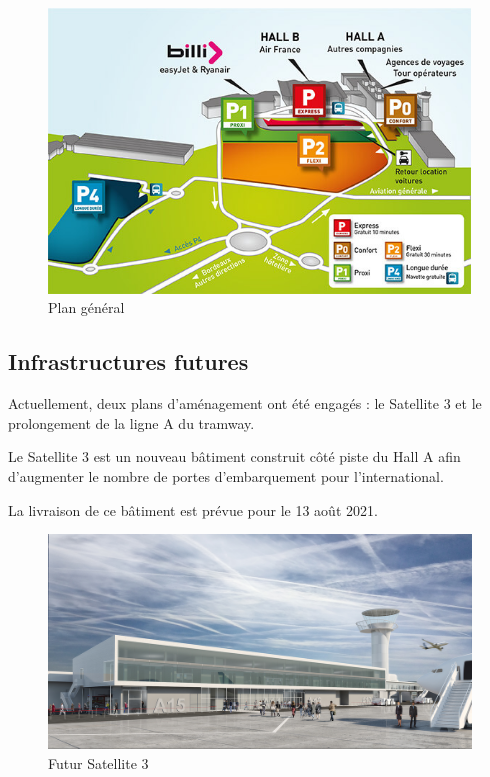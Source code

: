 \begin{figure}[hbt!]
    \centering
    \includegraphics[width=11.2cm]{Images/plan.jpg}
    \caption{Plan général}
    \label{fig:plangeneral}
\end{figure}

\newpage

\subsection{Infrastructures futures}

Actuellement, deux plans d'aménagement ont été engagés : le Satellite 3 et le prolongement de la ligne A du tramway.

Le Satellite 3 est un nouveau bâtiment construit côté piste du Hall A afin d'augmenter le nombre de portes d'embarquement pour l'international.

La livraison de ce bâtiment est prévue pour le 13 août 2021.\newline

\begin{figure}[hbt!]
    \centering
    \includegraphics[width=13cm]{Images/satellite3.jpg}
    \caption{Futur Satellite 3}
    \label{fig:sat3}
\end{figure}

